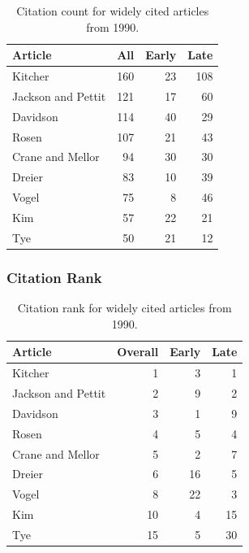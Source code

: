 \documentclass[
  10pt,
  letterpaper,
  DIV=11,
  numbers=noendperiod,
  twoside]{scrartcl}
\begin{document}
\begin{longtable}[]{@{}lrrr@{}}

\caption{\label{tbl-citation-count-1990}Citation count for widely cited
articles from 1990.}

\tabularnewline

\toprule\noalign{}
Article & All & Early & Late \\
\midrule\noalign{}
\endhead
\bottomrule\noalign{}
\endlastfoot
Kitcher & 160 & 23 & 108 \\
Jackson and Pettit & 121 & 17 & 60 \\
Davidson & 114 & 40 & 29 \\
Rosen & 107 & 21 & 43 \\
Crane and Mellor & 94 & 30 & 30 \\
Dreier & 83 & 10 & 39 \\
Vogel & 75 & 8 & 46 \\
Kim & 57 & 22 & 21 \\
Tye & 50 & 21 & 12 \\

\end{longtable}

\subsubsection*{Citation Rank}\label{sec-rank-1990}

\begin{longtable}[]{@{}lrrr@{}}

\caption{\label{tbl-citation-rank-1990}Citation rank for widely cited
articles from 1990.}

\tabularnewline

\toprule\noalign{}
Article & Overall & Early & Late \\
\midrule\noalign{}
\endhead
\bottomrule\noalign{}
\endlastfoot
Kitcher & 1 & 3 & 1 \\
Jackson and Pettit & 2 & 9 & 2 \\
Davidson & 3 & 1 & 9 \\
Rosen & 4 & 5 & 4 \\
Crane and Mellor & 5 & 2 & 7 \\
Dreier & 6 & 16 & 5 \\
Vogel & 8 & 22 & 3 \\
Kim & 10 & 4 & 15 \\
Tye & 15 & 5 & 30 \\

\end{longtable}
\end{document}
